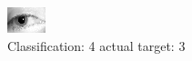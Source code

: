 \begin{figure}[h!]
\begin{center}
\includegraphics[width=0.60\columnwidth]{figures/ID1283_class_4_target_3.png}
\end{center}
\caption{ Classification: 4 actual target: 3}
\label{fig:ID1283_class_4_target_3}
\end{figure}
